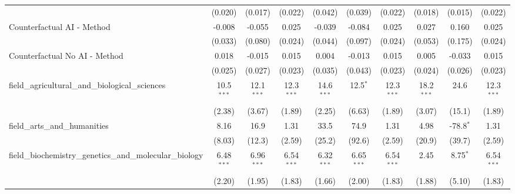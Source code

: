 \begin{tabular}{lccccccccc}
                                                               & (0.020)       & (0.017)        & (0.022)       & (0.042)       & (0.039)        & (0.022)       & (0.018)       & (0.015)        & (0.022)\\   
   Counterfactual AI - Method                                  & -0.008        & -0.055         & 0.025         & -0.039        & -0.084         & 0.025         & 0.027         & 0.160          & 0.025\\   
                                                               & (0.033)       & (0.080)        & (0.024)       & (0.044)       & (0.097)        & (0.024)       & (0.053)       & (0.175)        & (0.024)\\   
   Counterfactual No AI - Method                               & 0.018         & -0.015         & 0.015         & 0.004         & -0.013         & 0.015         & 0.005         & -0.033         & 0.015\\   
                                                               & (0.025)       & (0.027)        & (0.023)       & (0.035)       & (0.043)        & (0.023)       & (0.024)       & (0.026)        & (0.023)\\   
   field\_agricultural\_and\_biological\_sciences              & 10.5$^{***}$  & 12.1$^{***}$   & 12.3$^{***}$  & 14.6$^{***}$  & 12.5$^{*}$     & 12.3$^{***}$  & 18.2$^{***}$  & 24.6           & 12.3$^{***}$\\   
                                                               & (2.38)        & (3.67)         & (1.89)        & (2.25)        & (6.63)         & (1.89)        & (3.07)        & (15.1)         & (1.89)\\   
   field\_arts\_and\_humanities                                & 8.16          & 16.9           & 1.31          & 33.5          & 74.9           & 1.31          & 4.98          & -78.8$^{*}$    & 1.31\\   
                                                               & (8.03)        & (12.3)         & (2.59)        & (25.2)        & (92.6)         & (2.59)        & (20.9)        & (39.7)         & (2.59)\\   
   field\_biochemistry\_genetics\_and\_molecular\_biology      & 6.48$^{***}$  & 6.96$^{***}$   & 6.54$^{***}$  & 6.32$^{***}$  & 6.65$^{***}$   & 6.54$^{***}$  & 2.45          & 8.75$^{*}$     & 6.54$^{***}$\\   
                                                               & (2.20)        & (1.95)         & (1.83)        & (1.66)        & (2.00)         & (1.83)        & (1.88)        & (5.10)         & (1.83)\\   

\end{tabular}
